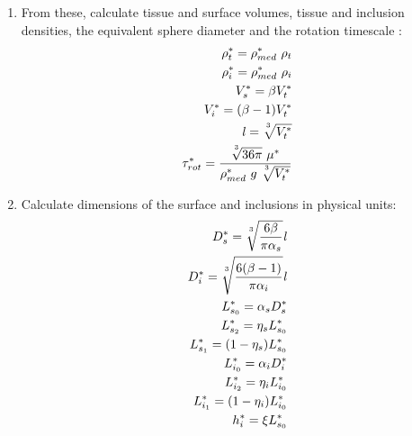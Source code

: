 \documentclass[10pt,a4paper]{article}
\def\non{\nonumber}
\def\l{\mathit{l}}
\begin{document}
\begin{enumerate}
	\item From these, calculate tissue and surface volumes, tissue and inclusion densities, the equivalent sphere diameter and the rotation timescale :
\begin{eqnarray}\label{nd2dpars3}
	\rho^*_t = \rho^*_{med} ~ \rho_t \non \\
	\rho^*_i = \rho^*_{med} ~ \rho_i \non \\
	V_s^* = \beta V_t^* \non \\
	V_i^* = (\beta-1) V_t^* \non \\
	\l = \sqrt[\uproot{5}3]{V_t^*} \non \\
	\tau^*_{rot} = \frac{\sqrt[\uproot{5}3]{36 \pi} ~ \mu^*}{\rho^*_{med} ~ g ~ \sqrt[\uproot{5}3]{V_t^*}}
\end{eqnarray}
\item Calculate dimensions of the surface and inclusions in physical units:
\begin{eqnarray}\label{nd2dpars4}
	D_s^* = \sqrt[\uproot{5}3]{\frac{6 \beta}{\pi \alpha_s}} \l \non \\
	D^*_i = \sqrt[\uproot{5}3]{\frac{6 (\beta-1)}{\pi \alpha_i}} \l \non \\
	L^*_{s_0} = \alpha_s D^*_s \non \\
	L^*_{s_2} = \eta_s L^*_{s_0} \non \\
	L^*_{s_1} = (1-\eta_s) L^*_{s_0} \non \\
	L^*_{i_0} = \alpha_i D^*_i \non \\
	L^*_{i_2} = \eta_i L^*_{i_0} \non \\
	L^*_{i_1} = (1-\eta_i) L^*_{i_0} \non \\
	h^*_i = \xi L^*_{s_0}  \non \\
\end{eqnarray}

\end{enumerate}
\end{document}

